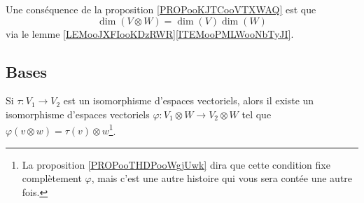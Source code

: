 Une conséquence de la proposition \ref{PROPooKJTCooVTXWAQ} est que
\begin{equation}
	\dim(V\otimes W)=\dim(V)\dim(W)
\end{equation}
via le lemme \ref{LEMooJXFIooKDzRWR}\ref{ITEMooPMLWooNbTyJI}.

\subsection{Bases}

\begin{lemma}        \label{LEMooXFIMooDkTSrq}
	Si \( \tau\colon V_1\to V_2\) est un isomorphisme d'espaces vectoriels, alors il existe un isomorphisme d'espaces vectoriels \( \varphi\colon V_1\otimes W\to V_2\otimes W\) tel que \( \varphi(v\otimes w)=\tau(v)\otimes w \)\footnote{La proposition \ref{PROPooTHDPooWgjUwk} dira que cette condition fixe complètement \( \varphi\), mais c'est une autre histoire qui vous sera contée une autre fois.}.
\end{lemma}

